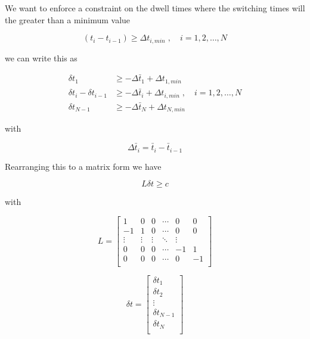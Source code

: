 We want to enforce a constraint on the dwell times where the switching times will the greater than a minimum value

\noindent
\begin{equation}
    (t_i - t_{i - 1}) \ge \Delta t_{i,min}\;, \quad i = 1,2,\dotso,N
\end{equation}

\noindent
we can write this as

\noindent
\begin{align}
    \delta t_1 &\ge - \Delta \bar{t}_1 + \Delta t_{1,min} \\
    \delta t_i - \delta t_{i-1} &\ge - \Delta \bar{t}_i + \Delta t_{i,min}\;, \quad i = 1,2,\dotso,N \\
    \delta t_{N-1} &\ge - \Delta \bar{t}_N + \Delta t_{N,min}
\end{align}

\noindent
with

\noindent
\begin{equation}
    \Delta \bar{t}_i = \bar{t}_i - \bar{t}_{i-1}
\end{equation}

Rearranging this to a matrix form we have

\begin{equation}
    L \delta t \ge c
\end{equation}

\noindent
with

\begin{equation}
    L =
    \left[
    \begin{matrix}
        1 & 0 & 0 & \dotsi & 0 & 0 \\
        -1 & 1 & 0 & \dotsi & 0 & 0 \\
        \vdots & \vdots & \vdots & \ddots & \vdots \\
        0 & 0 & 0 & \dotsi & -1 & 1 \\
        0 & 0 & 0 & \dotsi & 0 & -1 \\
    \end{matrix}
    \right]
\end{equation}


\begin{equation}
    \delta t =
    \left[
    \begin{matrix}
        \delta t_1 \\
        \delta t_2 \\
        \vdots \\
        \delta t_{N-1} \\
        \delta t_N \\
    \end{matrix}
    \right]
\end{equation}

